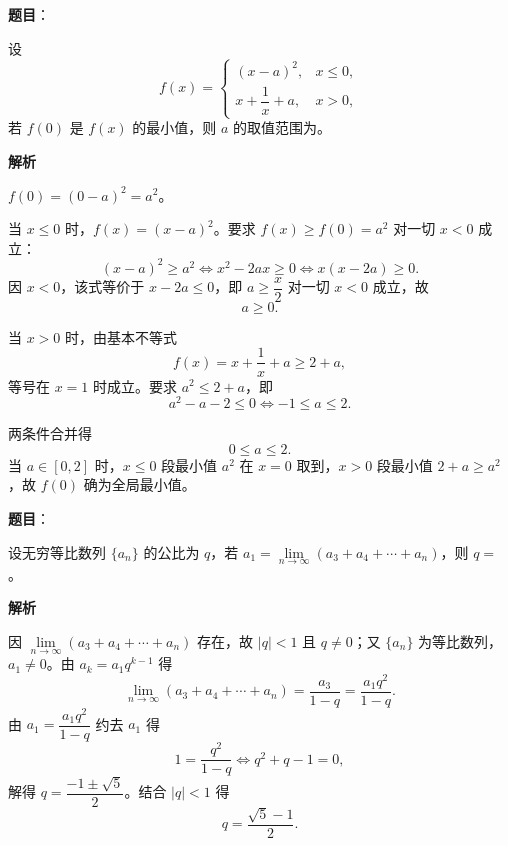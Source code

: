 \begin{answer}

\textbf{题目}：

设
\nopagebreak[4]
\[f(x)=\begin{cases}
(x-a)^2, & x\leqslant0,\\
x+\dfrac1x+a, & x>0,
\end{cases}\]
若 $f(0)$ 是 $f(x)$ 的最小值，则 $a$ 的取值范围为\gkblank{}。

\textbf{解析}

$f(0)=(0-a)^2=a^2$。

当 $x\leqslant0$ 时，$f(x)=(x-a)^2$。要求 $f(x)\geqslant f(0)=a^2$ 对一切 $x<0$ 成立：
\nopagebreak[4]
\[(x-a)^2\geqslant a^2\iff x^2-2ax\geqslant0\iff x(x-2a)\geqslant0 .\]
因 $x<0$，该式等价于 $x-2a\leqslant0$，即 $a\geqslant\dfrac x2$ 对一切 $x<0$ 成立，故
\nopagebreak[4]
\[a\geqslant0 .\]

当 $x>0$ 时，由基本不等式
\nopagebreak[4]
\[f(x)=x+\frac1x+a\geqslant2+a,\]
等号在 $x=1$ 时成立。要求 $a^2\leqslant2+a$，即
\nopagebreak[4]
\[a^2-a-2\leqslant0\iff-1\leqslant a\leqslant2 .\]

两条件合并得
\nopagebreak[4]
\[0\leqslant a\leqslant2 .\]
当 $a\in[0,2]$ 时，$x\leqslant0$ 段最小值 $a^2$ 在 $x=0$ 取到，$x>0$ 段最小值 $2+a\geqslant a^2$，故 $f(0)$ 确为全局最小值。


\end{answer}
\begin{answer}

\textbf{题目}：

设无穷等比数列 $\{a_n\}$ 的公比为 $q$，若 $a_1=\lim\limits_{n\to\infty}(a_3+a_4+\cdots+a_n)$，则 $q=$\gkblank{}。

\textbf{解析}

因 $\lim\limits_{n\to\infty}(a_3+a_4+\cdots+a_n)$ 存在，故 $|q|<1$ 且 $q\neq0$；又 $\{a_n\}$ 为等比数列，$a_1\neq0$。由 $a_k=a_1q^{k-1}$ 得
\nopagebreak[4]
\[\lim_{n\to\infty}(a_3+a_4+\cdots+a_n)=\frac{a_3}{1-q}=\frac{a_1q^2}{1-q}.\]
由 $a_1=\dfrac{a_1q^2}{1-q}$ 约去 $a_1$ 得
\nopagebreak[4]
\[1=\frac{q^2}{1-q}\iff q^2+q-1=0,\]
解得 $q=\dfrac{-1\pm\sqrt5}{2}$。结合 $|q|<1$ 得
\nopagebreak[4]
\[q=\frac{\sqrt5-1}{2}.\]


\end{answer}
